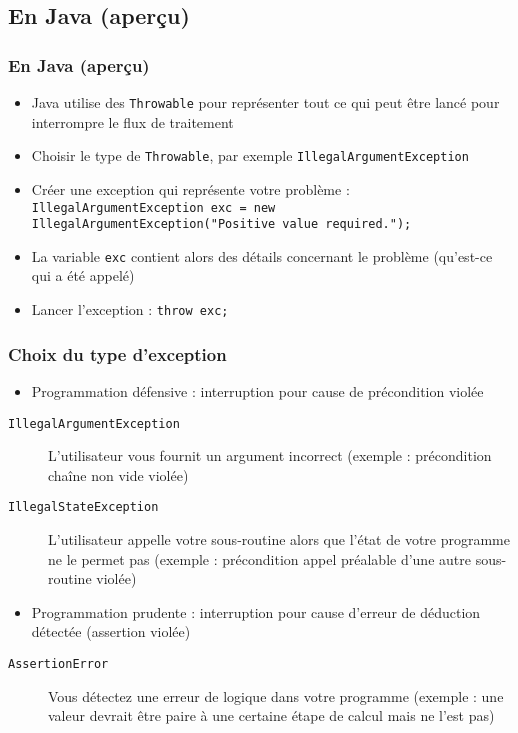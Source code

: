 \documentclass[english, french]{beamer}
\begin{document}
\subsection{En Java (aperçu)}
\begin{frame}
	\frametitle{En Java (aperçu)}
	\begin{itemize}
		\item Java utilise des \texttt{Throwable} pour représenter tout ce qui peut être lancé pour interrompre le flux de traitement
		\item Choisir le type de \texttt{Throwable}, par exemple \texttt{IllegalArgumentException}
		\item Créer une exception qui représente votre problème : \texttt{IllegalArgumentException exc = new IllegalArgumentException("Positive value required.");}
		\item La variable \texttt{exc} contient alors des détails concernant le problème (qu’est-ce qui a été appelé)
		\item Lancer l’exception : \texttt{throw exc;}
	\end{itemize}
\end{frame}

\begin{frame}
	\frametitle{Choix du type d’exception}
	\begin{itemize}
		\item Programmation défensive : interruption pour cause de précondition violée
	\end{itemize}
	\begin{description}%
		\item[\texttt{IllegalArgumentException}] L’utilisateur vous fournit un argument incorrect (exemple : précondition chaîne non vide violée)
		\item[\texttt{IllegalStateException}] L’utilisateur appelle votre sous-routine alors que l’état de votre programme ne le permet pas (exemple : précondition appel préalable d’une autre sous-routine violée)
	\end{description}
	\begin{itemize}
		\item Programmation prudente : interruption pour cause d’erreur de déduction détectée (assertion violée)
	\end{itemize}
	\begin{description}
		\item[\texttt{AssertionError}] Vous détectez une erreur de logique dans votre programme (exemple : une valeur devrait être paire à une certaine étape de calcul mais ne l’est pas)
	\end{description}
\end{frame}
\end{document}
